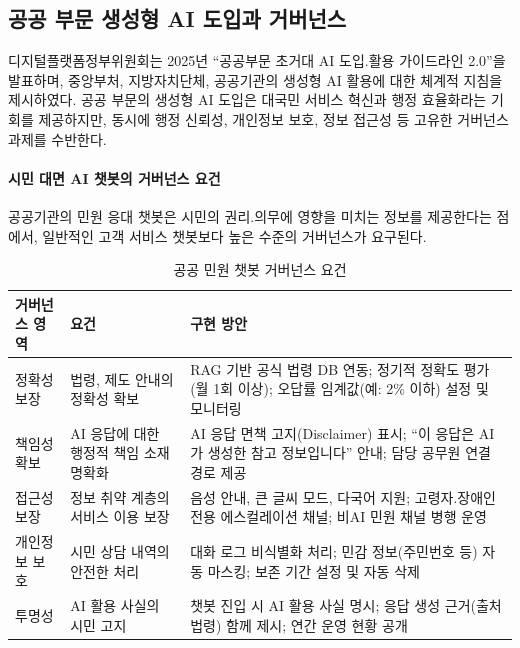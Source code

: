 \subsection{공공 부문 생성형 AI 도입과 거버넌스}
\label{sec:5.3.5}

디지털플랫폼정부위원회는 2025년 ``공공부문 초거대 AI 도입.활용 가이드라인 2.0''을
발표하며, 중앙부처, 지방자치단체, 공공기관의 생성형 AI 활용에 대한
체계적 지침을 제시하였다\cite{dpg_guideline_2025}.
공공 부문의 생성형 AI 도입은 대국민 서비스 혁신과 행정 효율화라는
기회를 제공하지만, 동시에 행정 신뢰성, 개인정보 보호, 정보 접근성 등
고유한 거버넌스 과제를 수반한다.

\paragraph{시민 대면 AI 챗봇의 거버넌스 요건}

공공기관의 민원 응대 챗봇은 시민의 권리.의무에 영향을 미치는 정보를
제공한다는 점에서, 일반적인 고객 서비스 챗봇보다 높은 수준의
거버넌스가 요구된다.

\begin{table}[htbp]
\centering
\caption{공공 민원 챗봇 거버넌스 요건}
\label{tab:public_chatbot_governance}
\begin{tabularx}{\textwidth}{p{2.5cm}p{3cm}X}
\toprule
\textbf{거버넌스 영역} & \textbf{요건} & \textbf{구현 방안} \\
\midrule
정확성 보장 &
법령, 제도 안내의 정확성 확보 &
RAG 기반 공식 법령 DB 연동; 정기적 정확도 평가(월 1회 이상); 오답률 임계값(예: 2\% 이하) 설정 및 모니터링 \\
\midrule
책임성 확보 &
AI 응답에 대한 행정적 책임 소재 명확화 &
AI 응답 면책 고지(Disclaimer) 표시; ``이 응답은 AI가 생성한 참고 정보입니다'' 안내; 담당 공무원 연결 경로 제공 \\
\midrule
접근성 보장 &
정보 취약 계층의 서비스 이용 보장 &
음성 안내, 큰 글씨 모드, 다국어 지원; 고령자.장애인 전용 에스컬레이션 채널; 비AI 민원 채널 병행 운영 \\
\midrule
개인정보 보호 &
시민 상담 내역의 안전한 처리 &
대화 로그 비식별화 처리; 민감 정보(주민번호 등) 자동 마스킹; 보존 기간 설정 및 자동 삭제 \\
\midrule
투명성 &
AI 활용 사실의 시민 고지 &
챗봇 진입 시 AI 활용 사실 명시; 응답 생성 근거(출처 법령) 함께 제시; 연간 운영 현황 공개 \\
\bottomrule
\end{tabularx}
\end{table}


